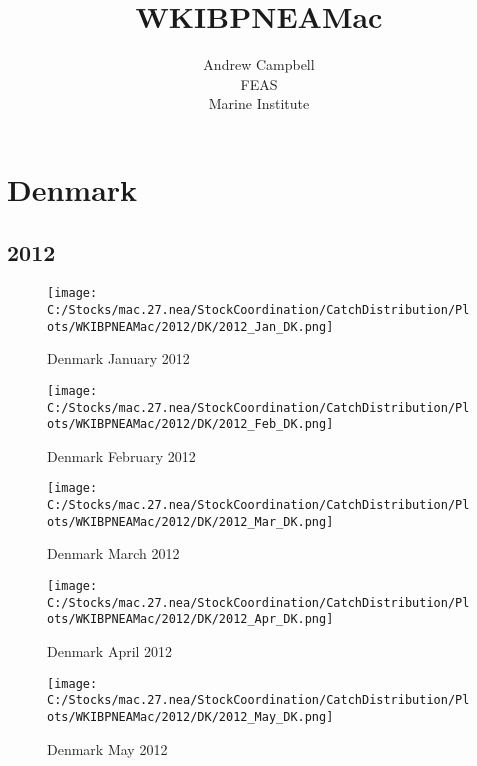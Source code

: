 \documentclass{article}
\begin{document}
\title{WKIBPNEAMac}
\author{Andrew Campbell \\ FEAS \\ Marine Institute}
\maketitle

\tableofcontents

\section{Denmark}



\newpage

\subsection{2012}



\begin{figure}[h]
	\centering
		\texttt{[image: C:/Stocks/mac.27.nea/StockCoordination/CatchDistribution/Plots/WKIBPNEAMac/2012/DK/2012\_Jan\_DK.png]}
	\caption{Denmark January 2012}
	\label{fig:2012_Jan_DK}
\end{figure}

\begin{figure}
	\centering
		\texttt{[image: C:/Stocks/mac.27.nea/StockCoordination/CatchDistribution/Plots/WKIBPNEAMac/2012/DK/2012\_Feb\_DK.png]}
	\caption{Denmark February 2012}
	\label{fig:2012_Feb_DK}
\end{figure}

\begin{figure}
	\centering
		\texttt{[image: C:/Stocks/mac.27.nea/StockCoordination/CatchDistribution/Plots/WKIBPNEAMac/2012/DK/2012\_Mar\_DK.png]}
	\caption{Denmark March 2012}
	\label{fig:2012_Mar_DK}
\end{figure}

\begin{figure}
	\centering
		\texttt{[image: C:/Stocks/mac.27.nea/StockCoordination/CatchDistribution/Plots/WKIBPNEAMac/2012/DK/2012\_Apr\_DK.png]}
	\caption{Denmark April 2012}
	\label{fig:2012_Apr_DK}
\end{figure}

\begin{figure}
	\centering
		\texttt{[image: C:/Stocks/mac.27.nea/StockCoordination/CatchDistribution/Plots/WKIBPNEAMac/2012/DK/2012\_May\_DK.png]}
	\caption{Denmark May 2012}
	\label{fig:2012_May_DK}
\end{figure}
\end{document}

